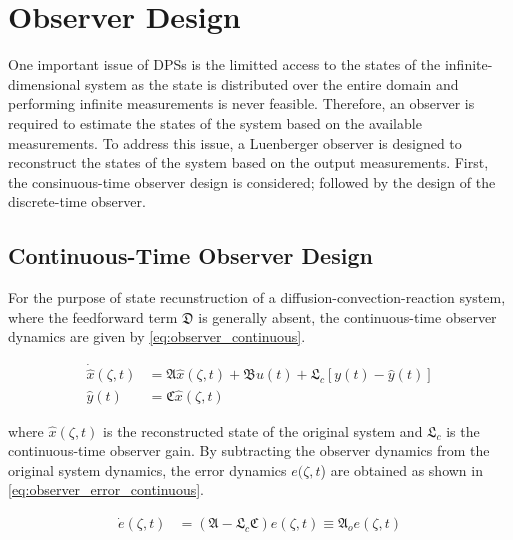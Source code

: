 \section{Observer Design}

One important issue of DPSs is the limitted access to the states of the infinite-dimensional system as the state is distributed over the entire domain and performing infinite measurements is never feasible. Therefore, an observer is required to estimate the states of the system based on the available measurements. To address this issue, a Luenberger observer is designed to reconstruct the states of the system based on the output measurements. First, the consinuous-time observer design is considered; followed by the design of the discrete-time observer.

\subsection{Continuous-Time Observer Design}

For the purpose of state recunstruction of a diffusion-convection-reaction system, where the feedforward term $\mathfrak{D}$ is generally absent, the continuous-time observer dynamics are given by \eqref{eq:observer_continuous}.

\begin{equation} \label{eq:observer_continuous}
    \begin{aligned}
        \dot{\hat{x}}(\zeta, t) &= \mathfrak{A} \hat{x}(\zeta, t) + \mathfrak{B} u(t) + \mathfrak{L}_c [y(t) - \hat{y}(t)] \\
        \hat{y}(t) &= \mathfrak{C} \hat{x}(\zeta, t)
    \end{aligned}
\end{equation}

where $\hat{x}(\zeta, t)$ is the reconstructed state of the original system and $\mathfrak{L}_c$ is the continuous-time observer gain. By subtracting the observer dynamics from the original system dynamics, the error dynamics $e(\zeta,t$) are obtained as shown in \eqref{eq:observer_error_continuous}.

\begin{equation} \label{eq:observer_error_continuous}
    \begin{aligned}
        \dot{e}(\zeta, t) &= (\mathfrak{A} - \mathfrak{L}_c \mathfrak{C}) e(\zeta, t) \equiv \mathfrak{A}_o e(\zeta,t) \\
    \end{aligned}
\end{equation}

